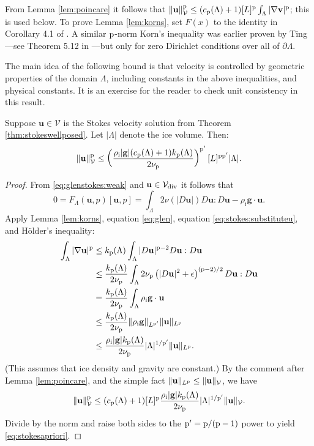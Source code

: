 \documentclass[hidelinks,onefignum,onetabnum,final]{siamart220329}  %
\newcommand{\eps}{\epsilon}
\newcommand{\grad}{\nabla}
\newcommand{\bg}{\mathbf{g}}
\newcommand{\bu}{\mathbf{u}}
\newcommand{\bv}{\mathbf{v}}
\newcommand{\cV}{\mathcal{V}}
\newcommand{\pp}{{\text{\textnormal{p}}}}
\newcommand{\rhoi}{\rho_{\text{i}}}
\newcommand{\Vdiv}{\cV_{\text{\textnormal{div}}}}
\begin{document}
From Lemma \ref{lem:poincare} it follows that $\|\bu\|_{\cV}^\pp \le (c_{\pp}(\Lambda) + 1) [L]^\pp \int_\Lambda |\grad\bv|^\pp$; this is used below.  To prove Lemma \ref{lem:korns}, set $F(x)$ to the identity in Corollary 4.1 of \cite{Pompe2003}.  A similar $\pp$-norm Korn's inequality was earlier proven by Ting \cite{Ting1972}---see Theorem 5.12 in \cite{KikuchiOden1988}---but only for zero Dirichlet conditions over all of $\partial \Lambda$.

The main idea of the following bound is that velocity is controlled by geometric properties of the domain $\Lambda$, including constants in the above inequalities, and physical constants.  It is an exercise for the reader to check unit consistency in this result.

\begin{lemma} \label{lem:stokesapriori}
Suppose $\bu\in\cV$ is the Stokes velocity solution from Theorem \ref{thm:stokeswellposed}.  Let $|\Lambda|$ denote the ice volume.  Then:
\begin{equation}
\|\bu\|_{\cV}^\pp \le \left(\frac{\rhoi |\bg| (c_{\pp}(\Lambda) + 1) k_{\pp}(\Lambda)}{2 \nu_\pp}\right)^{\pp'} [L]^{\pp\pp'} |\Lambda|. \label{eq:stokesapriori}
\end{equation}

\end{lemma}

\begin{proof}
From \eqref{eq:glenstokes:weak} and $\bu \in\Vdiv$ it follows that
\begin{equation}
0= F_\Lambda(\bu,p)[\bu,p] = \int_\Lambda 2 \nu(|D\bu|) D\bu : D\bu - \rhoi \bg \cdot \bu.  \label{eq:stokes:substituteu}
\end{equation}
Apply Lemma \ref{lem:korns}, equation \eqref{eq:glen}, equation \eqref{eq:stokes:substituteu}, and H\"older's inequality:
\begin{align}
\int_\Lambda |\grad\bu|^\pp &\le k_{\pp}(\Lambda) \int_\Lambda |D\bu|^{\pp-2} D\bu:D\bu \label{eq:stokes:workapriori} \\
	&\le \frac{k_{\pp}(\Lambda)}{2 \nu_\pp} \int_\Lambda 2 \nu_\pp \left(|D\bu|^2 + \eps\right)^{(\pp-2)/2} D\bu:D\bu \notag \\
	&= \frac{k_{\pp}(\Lambda)}{2 \nu_\pp} \int_\Lambda \rhoi \bg \cdot \bu \notag \\
	&\le \frac{k_{\pp}(\Lambda)}{2 \nu_\pp} \|\rhoi \bg\|_{L^{\pp'}} \|\bu\|_{L^\pp} \notag \\
	&\le \frac{\rhoi |\bg| k_{\pp}(\Lambda)}{2 \nu_\pp} |\Lambda|^{1/\pp'} \|\bu\|_{L^\pp}. \notag
\end{align}
(This assumes that ice density and gravity are constant.)  By the comment after Lemma \ref{lem:poincare}, and the simple fact $\|\bu\|_{L^\pp} \le \|\bu\|_{\cV}$, we have
\begin{align*}
\|\bu\|_{\cV}^\pp \le (c_{\pp}(\Lambda) + 1) [L]^\pp \frac{\rhoi |\bg| k_{\pp}(\Lambda)}{2 \nu_\pp} |\Lambda|^{1/\pp'} \|\bu\|_{\cV}.
\end{align*}
Divide by the norm and raise both sides to the $\pp' = \pp/(\pp-1)$ power to yield \eqref{eq:stokesapriori}.
\end{proof}
\end{document}
